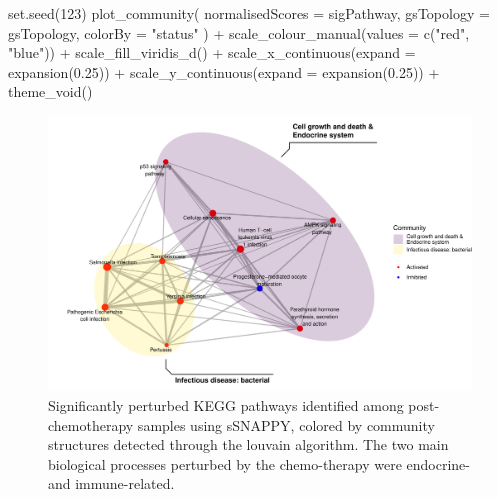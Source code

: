 \documentclass[9pt,a4paper,]{extarticle}
\newenvironment{Shaded}{\begin{snugshade}}{\end{snugshade}}
\newcommand{\AttributeTok}[1]{\textcolor[rgb]{0.77,0.63,0.00}{#1}}
\newcommand{\DecValTok}[1]{\textcolor[rgb]{0.00,0.00,0.81}{#1}}
\newcommand{\FloatTok}[1]{\textcolor[rgb]{0.00,0.00,0.81}{#1}}
\newcommand{\FunctionTok}[1]{\textcolor[rgb]{0.00,0.00,0.00}{#1}}
\newcommand{\NormalTok}[1]{#1}
\newcommand{\SpecialCharTok}[1]{\textcolor[rgb]{0.00,0.00,0.00}{#1}}
\newcommand{\StringTok}[1]{\textcolor[rgb]{0.31,0.60,0.02}{#1}}
\begin{document}
\begin{Shaded}
\begin{Highlighting}[]
\FunctionTok{set.seed}\NormalTok{(}\DecValTok{123}\NormalTok{)}
\FunctionTok{plot\_community}\NormalTok{(}
  \AttributeTok{normalisedScores =}\NormalTok{ sigPathway,}
  \AttributeTok{gsTopology =}\NormalTok{ gsTopology, }
  \AttributeTok{colorBy =} \StringTok{"status"}
\NormalTok{) }\SpecialCharTok{+}
  \FunctionTok{scale\_colour\_manual}\NormalTok{(}\AttributeTok{values =} \FunctionTok{c}\NormalTok{(}\StringTok{"red"}\NormalTok{, }\StringTok{"blue"}\NormalTok{)) }\SpecialCharTok{+}
  \FunctionTok{scale\_fill\_viridis\_d}\NormalTok{() }\SpecialCharTok{+}
  \FunctionTok{scale\_x\_continuous}\NormalTok{(}\AttributeTok{expand =} \FunctionTok{expansion}\NormalTok{(}\FloatTok{0.25}\NormalTok{)) }\SpecialCharTok{+}
  \FunctionTok{scale\_y\_continuous}\NormalTok{(}\AttributeTok{expand =} \FunctionTok{expansion}\NormalTok{(}\FloatTok{0.25}\NormalTok{)) }\SpecialCharTok{+}
  \FunctionTok{theme\_void}\NormalTok{() }
\end{Highlighting}
\end{Shaded}

\begin{figure}

{\centering \includegraphics[width=0.8\linewidth]{sSNAPPY_paper_files/figure-latex/Figure3-1} 

}

\caption{Significantly perturbed KEGG pathways identified among post-chemotherapy samples using sSNAPPY, colored by community structures detected through the louvain algorithm. The two main biological processes perturbed by the chemo-therapy were endocrine- and immune-related.}\label{fig:Figure3}
\end{figure}
\end{document}
